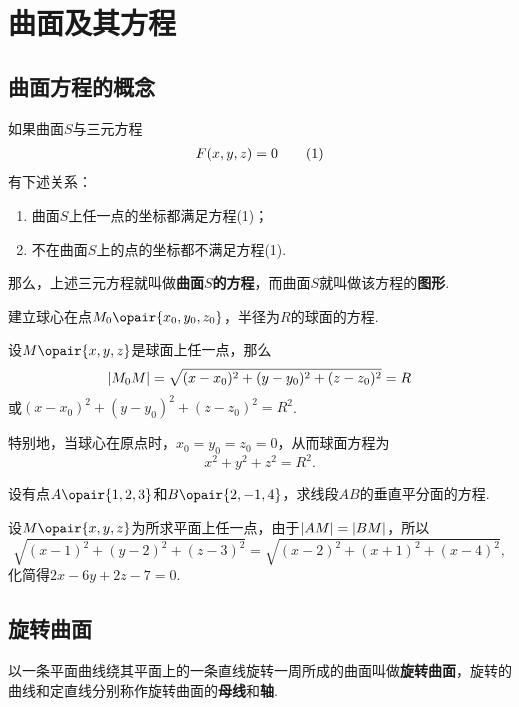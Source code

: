 \section{曲面及其方程}
\subsection{曲面方程的概念}
\begin{definition}
如果曲面\(S\)与三元方程\begin{gather}
F(x,y,z)=0 \tag1
\end{gather}有下述关系：
\begin{enumerate}
\item 曲面\(S\)上任一点的坐标都满足方程(1)；
\item 不在曲面\(S\)上的点的坐标都不满足方程(1).
\end{enumerate}
那么，上述三元方程就叫做\textbf{曲面\(S\)的方程}，而曲面\(S\)就叫做该方程的\textbf{图形}.
\end{definition}

\begin{example}
建立球心在点\(M_0\opair{x_0,y_0,z_0}\)，半径为\(R\)的球面的方程.
\begin{solution}
设\(M\opair{x,y,z}\)是球面上任一点，那么\[
\abs{M_0 M} = \sqrt{(x-x_0)^2+(y-y_0)^2+(z-z_0)^2} = R
\]或\((x-x_0)^2+(y-y_0)^2+(z-z_0)^2=R^2\).

特别地，当球心在原点时，\(x_0=y_0=z_0=0\)，从而球面方程为\[
x^2+y^2+z^2=R^2.
\]
\end{solution}
\end{example}

\begin{example}
设有点\(A\opair{1,2,3}\)和\(B\opair{2,-1,4}\)，求线段\(AB\)的垂直平分面的方程.
\begin{solution}
设\(M\opair{x,y,z}\)为所求平面上任一点，由于\(\abs{AM}=\abs{BM}\)，所以\[
\sqrt{(x-1)^2+(y-2)^2+(z-3)^2}=\sqrt{(x-2)^2+(x+1)^2+(x-4)^2},
\]化简得\(2x-6y+2z-7=0\).
\end{solution}
\end{example}

\subsection{旋转曲面}
\begin{definition}
以一条平面曲线绕其平面上的一条直线旋转一周所成的曲面叫做\textbf{旋转曲面}，旋转的曲线和定直线分别称作旋转曲面的\textbf{母线}和\textbf{轴}.
\end{definition}

